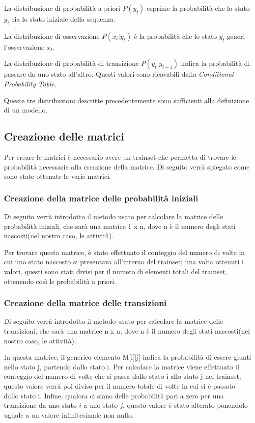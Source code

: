 \documentclass[10pt,a4paper]{article}
\begin{document}
	La distribuzione di probabilità a priori $ P(y_{t}) $ esprime la probabilità che lo stato $ y_{t} $ sia lo stato iniziale della sequenza.

	La distribuzione di osservazione $ P(x_{t} | y_{t}) $ è la probabilità che lo stato $ y_{t} $ generi l'osservazione $ x_{t} $.

	La distribuzione di probabilità di transizione $ P(y_{t} | y_{t - 1}) $ indica la probabilità di passare da uno stato all'altro. Questi valori sono ricavabili dalla \textit{Conditional Probability Table}.

	Queste tre distribuzioni descritte precedentemente sono sufficienti alla definizione di un modello.

	\subsection{Creazione delle matrici}
	Per creare le matrici è necessario avere un trainset che permetta di trovare le probabilità necessarie alla creazione della matrice.
	Di seguito verrà spiegato come sono state ottenute le varie matrici.

	\subsubsection{Creazione della matrice delle probabilità iniziali}
	Di seguito verrà introdotto il metodo usato per calcolare la matrice delle probabilità iniziali, che sarà una matrice  1 x n, dove n è il numero degli stati nascosti(nel nostro caso, le attività).

	Per trovare questa matrice, è stato effettuato il conteggio del numero di volte in cui uno stato nascosto si presentava all'interno del trainset; una volta ottenuti i valori, questi sono stati divisi per il numero di elementi totali del trainset, ottenendo così le probabilità a priori.

	\subsubsection{Creazione della matrice delle transizioni}
	Di seguito verrà introdotto il metodo usato per calcolare la matrice delle transizioni, che sarà una matrice  n x n, dove n è il numero degli stati nascosti(nel nostro caso, le attività).

	In questa matrice, il generico elemento M[i][j] indica la probabilità di essere giunti nello stato j, partendo dallo stato i. Per calcolare la matrice viene effettuato il conteggio del numero di volte che si passa dallo stato i allo stato j nel trainset; questo valore verrà poi diviso per il numero totale di volte in cui si è passato dallo stato i. Infine, qualora ci siano delle probabilità pari a zero per una transizione da uno stato $i$ a uno stato $j$, questo valore è stato alterato ponendolo uguale a un valore infinitesimale non nullo.
\end{document}
